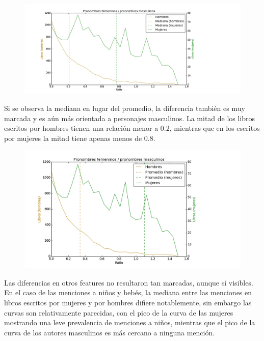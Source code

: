 \documentclass[
journal=jacsat, %
manuscript=article]{achemso}
\begin{document}
\begin{figure}[H]
  \centering
  \includegraphics[width=1\textwidth]{graficos/curvas_ratio.png}
  \caption{}
\end{figure}

Si se observa la mediana en lugar del promedio, la diferencia también es muy marcada y es aún más orientada a personajes masculinos. La mitad de los libros escritos por hombres tienen una relación menor a 0.2, mientras que en los escritos por mujeres la mitad tiene apenas menos de 0.8.

\begin{figure}[H]
  \centering
  \includegraphics[width=1\textwidth]{graficos/curvas_ratio_promedio.png}
  \caption{}
\end{figure}

Las diferencias en otros features no resultaron tan marcadas, aunque sí visibles. En el caso de las menciones a niños y bebés, la mediana entre las menciones en libros escritos por mujeres y por hombres difiere notablemente, sin embargo las curvas son relativamente parecidas, con el pico de la curva de las mujeres mostrando una leve prevalencia de menciones a niños, mientras que el pico de la curva de los autores masculinos es más cercano a ninguna mención.
\end{document}
